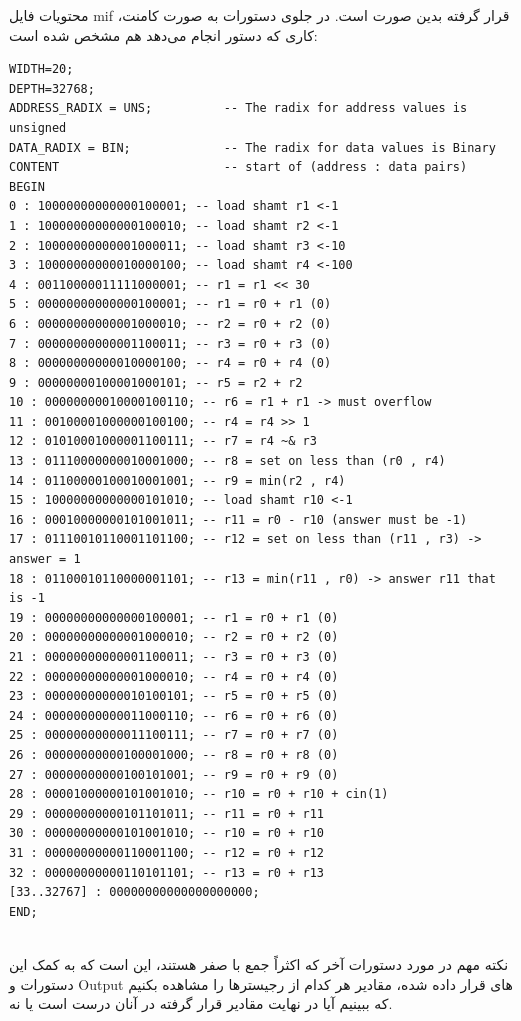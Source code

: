 \documentclass[12pt,titlepage,a4page , tikz , multi,table , svgnames,xcdraw]{article}
\begin{document}
محتویات فایل mif قرار گرفته بدین صورت است. در جلوی دستورات به صورت کامنت، کاری که دستور انجام می‌دهد هم مشخص شده است:


\begin{latin}
\begin{verbatim}
WIDTH=20;
DEPTH=32768;
ADDRESS_RADIX = UNS;          -- The radix for address values is unsigned
DATA_RADIX = BIN;             -- The radix for data values is Binary
CONTENT                       -- start of (address : data pairs)
BEGIN
0 : 10000000000000100001; -- load shamt r1 <-1
1 : 10000000000000100010; -- load shamt r2 <-1
2 : 10000000000001000011; -- load shamt r3 <-10
3 : 10000000000010000100; -- load shamt r4 <-100
4 : 00110000011111000001; -- r1 = r1 << 30
5 : 00000000000000100001; -- r1 = r0 + r1 (0)
6 : 00000000000001000010; -- r2 = r0 + r2 (0)
7 : 00000000000001100011; -- r3 = r0 + r3 (0)
8 : 00000000000010000100; -- r4 = r0 + r4 (0)
9 : 00000000100001000101; -- r5 = r2 + r2 
10 : 00000000010000100110; -- r6 = r1 + r1 -> must overflow
11 : 00100001000000100100; -- r4 = r4 >> 1
12 : 01010001000001100111; -- r7 = r4 ~& r3
13 : 01110000000010001000; -- r8 = set on less than (r0 , r4)
14 : 01100000100010001001; -- r9 = min(r2 , r4)
15 : 10000000000000101010; -- load shamt r10 <-1
16 : 00010000000101001011; -- r11 = r0 - r10 (answer must be -1)
17 : 01110010110001101100; -- r12 = set on less than (r11 , r3) -> answer = 1
18 : 01100010110000001101; -- r13 = min(r11 , r0) -> answer r11 that is -1
19 : 00000000000000100001; -- r1 = r0 + r1 (0)
20 : 00000000000001000010; -- r2 = r0 + r2 (0)
21 : 00000000000001100011; -- r3 = r0 + r3 (0)
22 : 00000000000001000010; -- r4 = r0 + r4 (0)
23 : 00000000000010100101; -- r5 = r0 + r5 (0)
24 : 00000000000011000110; -- r6 = r0 + r6 (0)
25 : 00000000000011100111; -- r7 = r0 + r7 (0)
26 : 00000000000100001000; -- r8 = r0 + r8 (0)
27 : 00000000000100101001; -- r9 = r0 + r9 (0)
28 : 00001000000101001010; -- r10 = r0 + r10 + cin(1)
29 : 00000000000101101011; -- r11 = r0 + r11
30 : 00000000000101001010; -- r10 = r0 + r10
31 : 00000000000110001100; -- r12 = r0 + r12
32 : 00000000000110101101; -- r13 = r0 + r13 
[33..32767] : 00000000000000000000;
END;


\end{verbatim} 
\end{latin}

نکته مهم در مورد دستورات آخر که اکثراً جمع با صفر هستند، این است که به کمک این دستورات و Output های قرار داده شده، مقادیر هر کدام از رجیسترها را مشاهده بکنیم که ببینیم آیا در نهایت مقادیر قرار گرفته در آنان درست است یا نه.
\end{document}
